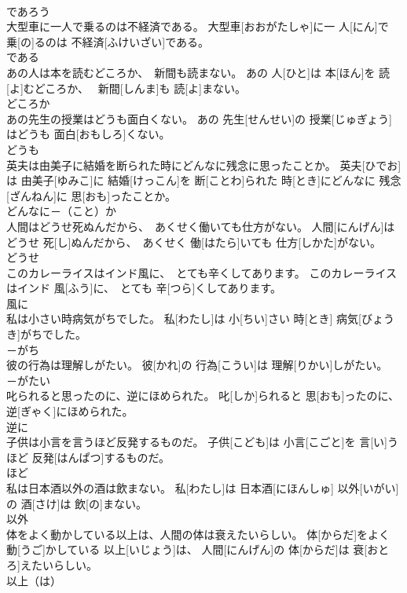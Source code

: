 \documentclass[8pt]{extreport}
\begin{document}
\begin{CJK}{UTF8}{min}
\\	であろう	
\\	大型車に一人で乗るのは不経済である。	大型車[おおがたしゃ]に一 人[にん]で 乗[の]るのは 不経済[ふけいざい]である。	
\\	である	
\\	あの人は本を読むどころか、　新間も読まない。	あの 人[ひと]は 本[ほん]を 読[よ]むどころか、　 新間[しんま]も 読[よ]まない。	
\\	どころか	
\\	あの先生の授業はどうも面白くない。	あの 先生[せんせい]の 授業[じゅぎょう]はどうも 面白[おもしろ]くない。	
\\	どうも	
\\	英夫は由美子に結婚を断られた時にどんなに残念に思ったことか。	英夫[ひでお]は 由美子[ゆみこ]に 結婚[けっこん]を 断[ことわ]られた 時[とき]にどんなに 残念[ざんねん]に 思[おも]ったことか。	
\\	どんなに－（こと）か	
\\	人間はどうせ死ぬんだから、　あくせく働いても仕方がない。	人間[にんげん]はどうせ 死[し]ぬんだから、　あくせく 働[はたら]いても 仕方[しかた]がない。	
\\	どうせ	
\\	このカレーライスはインド風に、　とても辛くしてあります。	このカレーライスはインド 風[ふう]に、　とても 辛[つら]くしてあります。	
\\	風に	
\\	私は小さい時病気がちでした。	私[わたし]は 小[ちい]さい 時[とき] 病気[びょうき]がちでした。	
\\	－がち	
\\	彼の行為は理解しがたい。	彼[かれ]の 行為[こうい]は 理解[りかい]しがたい。	
\\	－がたい	
\\	叱られると思ったのに、逆にほめられた。	叱[しか]られると 思[おも]ったのに、 逆[ぎゃく]にほめられた。	
\\	逆に	
\\	子供は小言を言うほど反発するものだ。	子供[こども]は 小言[こごと]を 言[い]うほど 反発[はんぱつ]するものだ。	
\\	ほど	
\\	私は日本酒以外の酒は飲まない。	私[わたし]は 日本酒[にほんしゅ] 以外[いがい]の 酒[さけ]は 飲[の]まない。	
\\	以外	
\\	体をよく動かしている以上は、人間の体は衰えたいらしい。	体[からだ]をよく 動[うご]かしている 以上[いじょう]は、 人間[にんげん]の 体[からだ]は 衰[おとろ]えたいらしい。	
\\	以上（は）	

\end{CJK}
\end{document}
